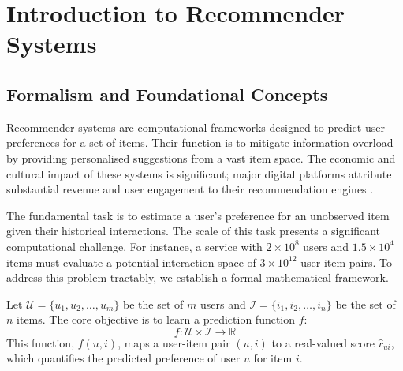 
\begin{spacing}{1} %
\minitoc %
\end{spacing} %
\thesisspacing %


\chapter{Introduction to Recommender Systems}
\label{ch:intro}


\section{Formalism and Foundational Concepts}

Recommender systems are computational frameworks designed to predict user preferences for a set of items. Their function is to mitigate information overload by providing personalised suggestions from a vast item space. The economic and cultural impact of these systems is significant; major digital platforms attribute substantial revenue and user engagement to their recommendation engines \cite{linden2003amazon, schedl2018current}.

The fundamental task is to estimate a user's preference for an unobserved item given their historical interactions. The scale of this task presents a significant computational challenge. For instance, a service with $2 \times 10^8$ users and $1.5 \times 10^4$ items must evaluate a potential interaction space of $3 \times 10^{12}$ user-item pairs. To address this problem tractably, we establish a formal mathematical framework.

Let $\mathcal{U} = \{u_1, u_2, \ldots, u_m\}$ be the set of $m$ users and $\mathcal{I} = \{i_1, i_2, \ldots, i_n\}$ be the set of $n$ items. The core objective is to learn a prediction function $f$:
\begin{equation}
f: \mathcal{U} \times \mathcal{I} \rightarrow \mathbb{R}
\end{equation}
This function, $f(u, i)$, maps a user-item pair $(u, i)$ to a real-valued score $\hat{r}_{ui}$, which quantifies the predicted preference of user $u$ for item $i$.


